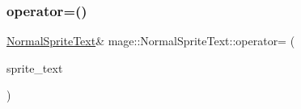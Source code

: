 \hypertarget{classmage_1_1_normal_sprite_text_a034dd8c1c084216a247896ffbe50e61d}{}\label{classmage_1_1_normal_sprite_text_a034dd8c1c084216a247896ffbe50e61d} 
\subsubsection{\texorpdfstring{operator=()}{operator=()}\hspace{0.1cm}{\footnotesize\ttfamily [2/2]}}
{\footnotesize\ttfamily \hyperlink{classmage_1_1_normal_sprite_text}{Normal\+Sprite\+Text}\& mage\+::\+Normal\+Sprite\+Text\+::operator= (\begin{DoxyParamCaption}\item[{\hyperlink{classmage_1_1_normal_sprite_text}{Normal\+Sprite\+Text} \&\&}]{sprite\+\_\+text }\end{DoxyParamCaption})\hspace{0.3cm}{\ttfamily [default]}}

